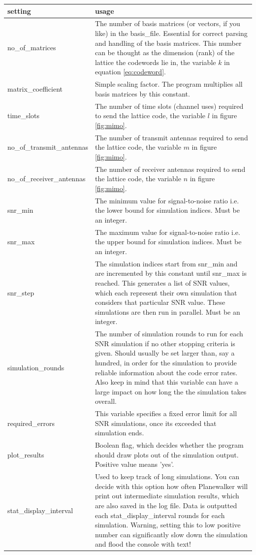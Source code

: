 \documentclass[english,12pt,a4paper,pdftex,sci,utf8]{aaltothesis}
\begin{document}
\pagebreak
\begin{center}
  \begin{tabular}{ | l | p{9cm} | }
    \hline
    setting & usage  \\ \hline
    no\_of\_matrices & The number of basis matrices (or vectors, if you like) in the basis\_file. Essential for correct parsing and handling of the basis matrices. This number can be thought as the dimension (rank) of the lattice the codewords lie in, the variable $k$ in equation \eqref{eq:codeword}.\\ \hline
    matrix\_coefficient & Simple scaling factor. The program multiplies all basis matrices by this constant. \\ \hline
    time\_slots & The number of time slots (channel uses) required to send the lattice code, the variable $l$ in figure \ref{fig:mimo}. \\ \hline
    no\_of\_transmit\_antennas & The number of transmit antennas required to send the lattice code, the variable $m$ in figure \ref{fig:mimo}. \\ \hline
    no\_of\_receiver\_antennas & The number of receiver antennas required to send the lattice code, the variable $n$ in figure \ref{fig:mimo}. \\
    snr\_min & The minimum value for signal-to-noise ratio i.e. the lower bound for simulation indices. Must be an integer. \\ \hline
    snr\_max & The maximum value for signal-to-noise ratio i.e. the upper bound for simulation indices. Must be an integer. \\ \hline
    snr\_step & The simulation indices start from snr\_min and are incremented by this constant until snr\_max is reached. This generates a list of SNR values, which each represent their own simulation that considers that particular SNR value. These simulations are then run in parallel. Must be an integer. \\ \hline
    simulation\_rounds & The number of simulation rounds to run for each SNR simulation if no other stopping criteria is given. Should usually be set larger than, say a hundred, in order for the simulation to provide reliable information about the code error rates. Also keep in mind that this variable can have a large impact on how long the the simulation takes overall. \\ \hline
    required\_errors & This variable specifies a fixed error limit for all SNR simulations, once its exceeded that simulation ends. \\ \hline
    plot\_results & Boolean flag, which decides whether the program should draw plots out of the simulation output. Positive value means 'yes'. \\ \hline
    stat\_display\_interval & Used to keep track of long simulations. You can decide with this option how often Planewalker will print out intermediate simulation results, which are also saved in the log file. Data is outputted each stat\_display\_interval rounds for each simulation. Warning, setting this to low positive number can significantly slow down the simulation and flood the console with text! \\  
    \hline
  \end{tabular}
\end{center}
\end{document}
